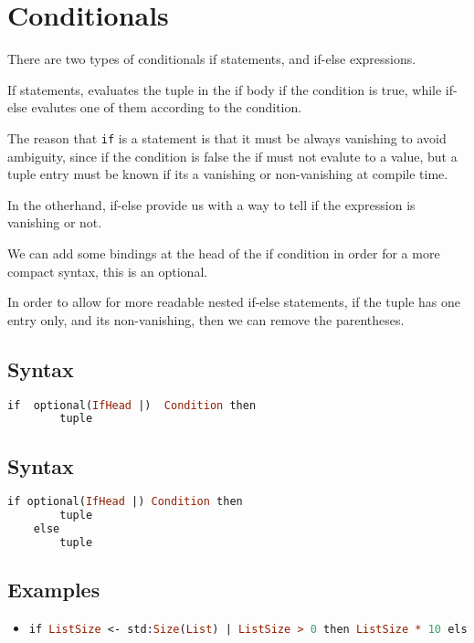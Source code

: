 \section{Conditionals}

There are two types of conditionals if statements, and if-else
expressions.

If statements, evaluates the tuple in the if body if the condition is
true, while if-else evalutes one of them according to the condition.

The reason that \texttt{if} is a statement is that it must be always
vanishing to avoid ambiguity, since if the condition is false the if
must not evalute to a value, but a tuple entry must be known if its a
vanishing or non-vanishing at compile time.

In the otherhand, if-else provide us with a way to tell if the
expression is vanishing or not.

We can add some bindings at the head of the if condition in order for
a more compact syntax, this is an optional.

In order to allow for more readable nested if-else statements, if the tuple
has one entry only, and its non-vanishing, then we can remove the parentheses.

\subsection{Syntax}
\begin{lstlisting}[language =Prolog]
    if  optional(IfHead |)  Condition then 
        tuple
\end{lstlisting}

\subsection{Syntax}
\begin{lstlisting}[language =Prolog]
    if optional(IfHead |) Condition then 
        tuple
    else 
        tuple
\end{lstlisting}

\subsection{Examples}

\begin{itemize}

	\item  \begin{lstlisting}[language =Prolog]
                if ListSize <- std:Size(List) | ListSize > 0 then ListSize * 10 else ListSize
            \end{lstlisting}
\end{itemize}

